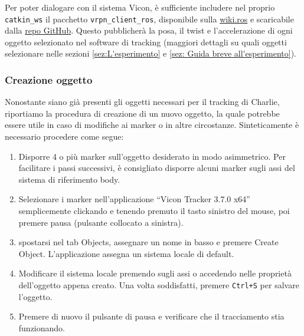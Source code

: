 Per poter dialogare con il sistema Vicon, è sufficiente includere nel proprio \texttt{catkin\_ws} il pacchetto \texttt{vrpn\_client\_ros}, disponibile sulla \href{https://wiki.ros.org/vrpn_client_ros}{wiki.ros} e scaricabile dalla \href{https://github.com/ros-drivers/vrpn_client_ros}{repo GitHub}.
Questo pubblicherà la posa, il twist e l'accelerazione di ogni oggetto selezionato nel software di tracking (maggiori dettagli su quali oggetti selezionare nelle sezioni \ref{sez:L'esperimento} e \ref{sez: Guida breve all'esperimento}).

\subsubsection*{Creazione oggetto}
\label{sez:Sistema Vicon_oggetto}
Nonostante siano già presenti gli oggetti necessari per il tracking di Charlie, riportiamo la procedura di creazione di un nuovo oggetto, la quale potrebbe essere utile in caso di modifiche ai marker o in altre circostanze. 
Sinteticamente è necessario procedere come segue:
\begin{enumerate}
	\item Disporre 4 o più marker sull'oggetto desiderato in modo asimmetrico. Per facilitare i passi successivi, è consigliato disporre alcuni marker sugli assi del sistema di riferimento body.
	
	\item Selezionare i marker nell'applicazione ``Vicon Tracker 3.7.0 x64'' semplicemente clickando e tenendo premuto il tasto sinistro del mouse, poi premere pausa (pulsante collocato a sinistra).
	
	\item spostarsi nel tab Objects, assegnare un nome in basso e premere Create Object. L'applicazione assegna un sistema locale di default.
	
	\item Modificare il sistema locale premendo sugli assi o accedendo nelle proprietà dell'oggetto appena creato. Una volta soddisfatti, premere \texttt{Ctrl+S} per salvare l'oggetto.
	
	\item Premere di nuovo il pulsante di pausa e verificare che il tracciamento stia funzionando.
\end{enumerate}

